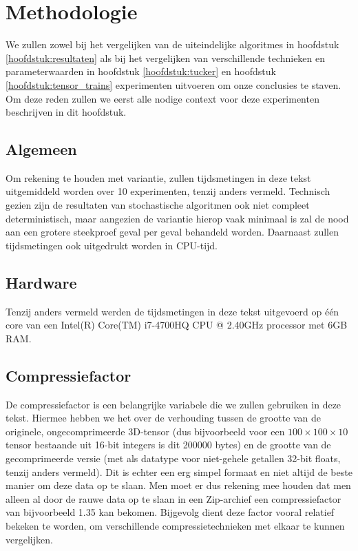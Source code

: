 \chapter{Methodologie}
\label{hoofdstuk:3}

We zullen zowel bij het vergelijken van de uiteindelijke algoritmes in hoofdstuk \ref{hoofdstuk:resultaten} als bij het vergelijken van verschillende technieken en parameterwaarden in hoofdstuk \ref{hoofdstuk:tucker} en hoofdstuk \ref{hoofdstuk:tensor_trains} experimenten uitvoeren om onze conclusies te staven. Om deze reden zullen we eerst alle nodige context voor deze experimenten beschrijven in dit hoofdstuk.

\section{Algemeen}
Om rekening te houden met variantie, zullen tijdsmetingen in deze tekst uitgemiddeld worden over 10 experimenten, tenzij anders vermeld. Technisch gezien zijn de resultaten van stochastische algoritmen ook niet compleet deterministisch, maar aangezien de variantie hierop vaak minimaal is zal de nood aan een grotere steekproef geval per geval behandeld worden. Daarnaast zullen tijdsmetingen ook uitgedrukt worden in CPU-tijd.

\section{Hardware}
Tenzij anders vermeld werden de tijdsmetingen in deze tekst uitgevoerd op \'e\'en core van een Intel(R) Core(TM) i7-4700HQ CPU @ 2.40GHz processor met 6GB RAM.

\section{Compressiefactor}

De compressiefactor is een belangrijke variabele die we zullen gebruiken in deze tekst. Hiermee hebben we het over de verhouding tussen de grootte van de originele, ongecomprimeerde 3D-tensor (dus bijvoorbeeld voor een $100 \times 100 \times 10$ tensor bestaande uit 16-bit integers is dit 200000 bytes) en de grootte van de gecomprimeerde versie (met als datatype voor niet-gehele getallen 32-bit floats, tenzij anders vermeld). Dit is echter een erg simpel formaat en niet altijd de beste manier om deze data op te slaan. Men moet er dus rekening mee houden dat men alleen al door de rauwe data op te slaan in een Zip-archief een compressiefactor van bijvoorbeeld 1.35 kan bekomen. Bijgevolg dient deze factor vooral relatief bekeken te worden, om verschillende compressietechnieken met elkaar te kunnen vergelijken.\\

